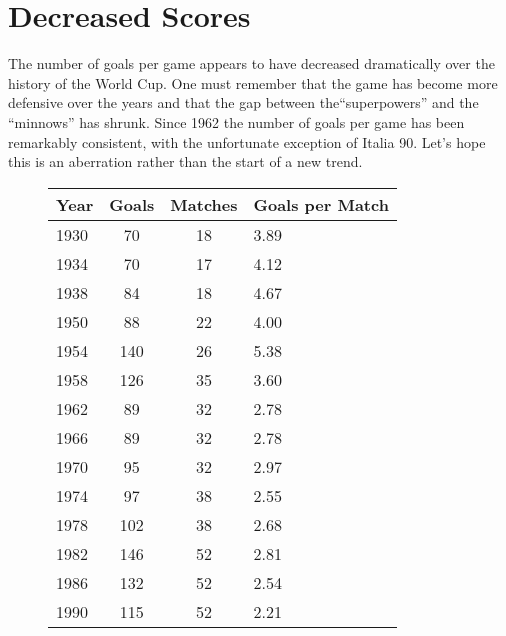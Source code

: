 \section{Decreased Scores}
The number of goals per game appears to have decreased dramatically over the 
history of the World Cup. One must remember that the game has become more 
defensive over the years and that the gap between the``superpowers'' and the 
``minnows'' has shrunk. Since 1962 the number of goals per game has been 
remarkably consistent, with the unfortunate exception of Italia 90. Let's hope 
this is an aberration rather than the start of a new trend.
\begin{figure}[H]
\begin{tabular}{l c c l}
Year & Goals & Matches & Goals per Match \\ \hline
1930 & 70 & 18 & 3.89 \\
1934 & 70 & 17 & 4.12 \\
1938 & 84 & 18 & 4.67 \\
1950 &  88 & 22 & 4.00 \\
1954 & 140 & 26 & 5.38 \\
1958 & 126 & 35 & 3.60 \\
1962 & 89 & 32 & 2.78 \\
1966 & 89 & 32 & 2.78 \\
1970 & 95 & 32 & 2.97 \\
1974 & 97 & 38 & 2.55 \\
1978 & 102 & 38 & 2.68 \\
1982 & 146 & 52 & 2.81 \\
1986 & 132 & 52 & 2.54 \\
1990 & 115 & 52 & 2.21 \\ \hline
\end{tabular}
\end{figure}

